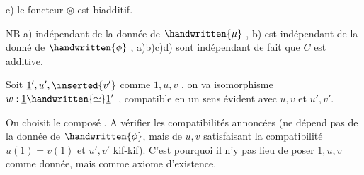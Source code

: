 e) le foncteur $\otimes$ est biadditif.


NB a)  indépendant de la donnée de $\handwritten{\mu}$ , b) est indépendant de la donné de $\handwritten{\phi}$ , a)b)c)d) sont indépendant de fait que $C$ est additive.

Soit $\underline{1}',u',\inserted{v'}$ comme $\underline{1},u,v$ , on va  isomorphisme $w:\underline{1}\handwritten{\simeq}\underline{1}'$ , compatible en un sens évident avec $u,v$ et $u',v'$.

On choisit le composé
. A vérifier les compatibilités annoncées (ne dépend pas de la donnée de $\handwritten{\phi}$,  mais de $u,v$ satisfaisant la compatibilité $\underline{u}(\underline{1})=v(\underline{1})$\deleted{\unsure{,}} et $u',v'$ kif-kif). C'est pourquoi il n'y pas lieu de poser $\underline{1},u,v$ comme donnée, mais comme axiome d'existence.
